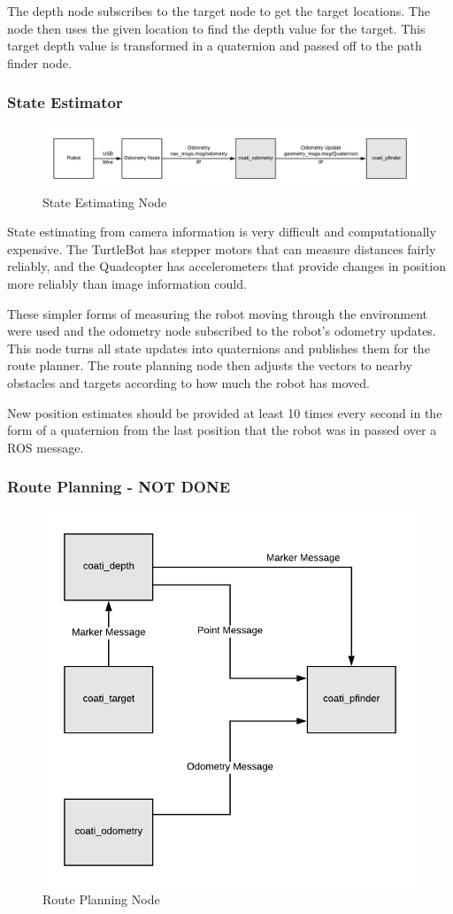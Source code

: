 \documentclass{article}
\begin{document}
    The depth node subscribes to the target node to get the target locations. The node then uses the given location to find the depth value for the target. This target depth value is transformed in a quaternion and passed off to the path finder node. 
	
	\subsubsection{State Estimator}
	
	\begin{figure}[H]
		\centering
		\includegraphics[width=0.9\linewidth]{OdometryDigram.png}
		\caption{State Estimating Node}
		\label{fig:state}
	\end{figure}

	State estimating from camera information is very difficult and computationally expensive. The TurtleBot has stepper motors that can measure distances fairly reliably, and the Quadcopter has accelerometers that provide changes in position more reliably than image information could. 
	
	These simpler forms of measuring the robot moving through the environment were used and the odometry node subscribed to the robot's odometry updates. This node turns all state updates into quaternions and publishes them for the route planner. The route planning node then adjusts the vectors to nearby obstacles and targets according to how much the robot has moved. 
	
	New position estimates should be provided at least 10 times every second in the form of a quaternion from the last position that the robot was in passed over a ROS message.

	\subsubsection{Route Planning - NOT DONE}
	
	\begin{figure}[H]
		\centering
		\includegraphics[width=0.6\linewidth]{PathFinderDiagram.png}
		\caption{Route Planning Node}
		\label{fig:routeplanning}
	\end{figure}
\end{document}
